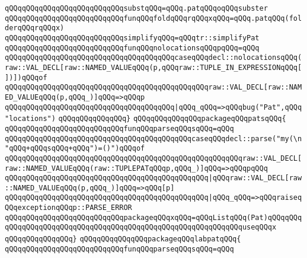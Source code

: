 \verb|qQQqqQQqqQQqqQQqqQQqqQQqqQQqsubstqQQq=qQQq.patqQQqoqQQqsubster|\newline
\verb|qQQqqQQqqQQqqQQqqQQqqQQqqQQqfunqQQqfoldqQQqrqQQqxqQQq=qQQq.patqQQq(folderqQQqrqQQqx)|\newline
\verb|qQQqqQQqqQQqqQQqqQQqqQQqqQQqsimplifyqQQq=qQQqtr::simplifyPat|\newline
\verb|qQQqqQQqqQQqqQQqqQQqqQQqqQQqfunqQQqnolocationsqQQqpqQQq=qQQq|\newline
\verb|qQQqqQQqqQQqqQQqqQQqqQQqqQQqqQQqqQQqqQQqcaseqQQqdecl::nolocationsqQQq(raw::VAL_DECL[raw::NAMED_VALUEqQQq(p,qQQqraw::TUPLE_IN_EXPRESSIONqQQq[])])qQQqof|\newline
\verb|qQQqqQQqqQQqqQQqqQQqqQQqqQQqqQQqqQQqqQQqqQQqqQQqraw::VAL_DECL[raw::NAMED_VALUEqQQq(p,qQQq_)]qQQq=>qQQqp|\newline
\verb|qQQqqQQqqQQqqQQqqQQqqQQqqQQqqQQqqQQqqQQq|\verb#|qQQq_qQQq=>qQQqbug("Pat",qQQq"locations")#\newline
\verb|qQQqqQQqqQQqqQQq}|\newline
\newline
\verb|qQQqqQQqqQQqqQQqpackageqQQqpatsqQQq{|\newline
\newline
\verb|qQQqqQQqqQQqqQQqqQQqqQQqqQQqfunqQQqparseqQQqsqQQq=qQQq|\newline
\verb|qQQqqQQqqQQqqQQqqQQqqQQqqQQqqQQqqQQqqQQqqQQqcaseqQQqdecl::parse("my(\n"qQQq+qQQqsqQQq+qQQq")=()")qQQqof|\newline
\verb|qQQqqQQqqQQqqQQqqQQqqQQqqQQqqQQqqQQqqQQqqQQqqQQqqQQqqQQqraw::VAL_DECL[raw::NAMED_VALUEqQQq(raw::TUPLEPATqQQqp,qQQq_)]qQQq=>qQQqpqQQq|\newline
\verb|qQQqqQQqqQQqqQQqqQQqqQQqqQQqqQQqqQQqqQQqqQQqqQQq|\verb#|qQQqraw::VAL_DECL[raw::NAMED_VALUEqQQq(p,qQQq_)]qQQq=>qQQq[p]#\newline
\verb|qQQqqQQqqQQqqQQqqQQqqQQqqQQqqQQqqQQqqQQqqQQqqQQq|\verb#|qQQq_qQQq=>qQQqraiseqQQqexceptionqQQqp::PARSE_ERROR#\newline
\verb|qQQqqQQqqQQqqQQqqQQqqQQqqQQqpackageqQQqxqQQq=qQQqListqQQq(Pat)qQQqqQQqqQQqqQQqqQQqqQQqqQQqqQQqqQQqqQQqqQQqqQQqqQQqqQQqqQQqqQQquseqQQqx|\newline
\verb|qQQqqQQqqQQqqQQq}|\newline
\newline
\verb|qQQqqQQqqQQqqQQqpackageqQQqlabpatqQQq{|\newline
\newline
\verb|qQQqqQQqqQQqqQQqqQQqqQQqqQQqfunqQQqparseqQQqsqQQq=qQQq|\newline
